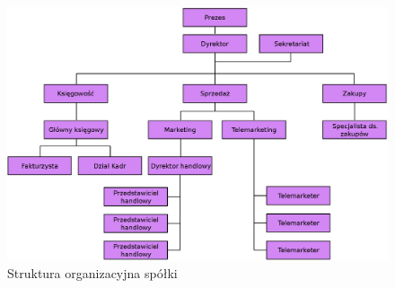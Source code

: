 \begin{figure}[H]
    \centering
    \includegraphics[width=1\textwidth]{img/organization_chart.eps}
    \caption{Struktura organizacyjna spółki}
\end{figure}